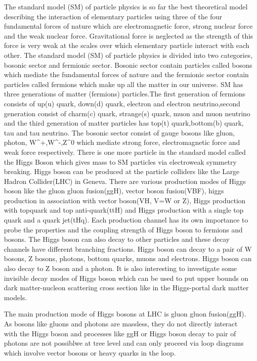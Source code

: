 \documentclass[final,3p]{CSP}
\begin{document}
The standard model (SM) of particle physics is so far the best theoretical model describing the interaction of elementary 
particles using three of the four fundamental forces of nature which are electromagnetic force, strong nuclear force and the weak
nuclear force. Gravitational force is neglected as the strength of this force is very weak at the scales over which elementary 
particle interact with each other. The standard model (SM) of particle physics is divided into two categories, bosonic sector 
and fermionic sector. Bosonic sector contain particles called bosons which mediate the fundamental forces of nature and the
fermionic sector contain particles called fermions which make up all the matter in our universe. SM has three generations of 
matter (fermions) particles.The first generation of fermions consists of up(u) quark, down(d) quark, electron and electron neutrino,second generation consist of charm(c) quark, strange(s) quark, muon and muon neutrino and the third generation of matter 
particles has top(t) quark,bottom(b) quark, tau and tau neutrino. The bosonic sector consist of gauge bosons like gluon, photon, 
W^+,W^-,Z^0 which mediate strong force, electromagnetic force and weak force respectively. There is one more particle in the 
standard model called the Higgs Boson which gives mass to SM particles via electroweak symmetry breaking. Higgs boson can be 
produced at the particle colliders like the Large Hadron Collider(LHC) in Geneva. There are various production modes of Higgs 
boson like the gluon gluon  fusion(ggH), vector boson fusion(VBF), higgs production in association with vector boson(VH, V=W or 
Z), Higgs production with topquark and top anti-quark(ttH) and Higgs production with a single top quark and a quark jet(tHq). 
Each production channel has its own importance to probe the properties and the coupling strength of Higgs boson to fermions and 
bosons. The Higgs boson can also decay to other particles and these decay channels have different branching fractions. Higgs 
boson can decay to a pair of W bosons, Z bosons, photons, bottom quarks, muons and electrons. Higgs boson can also decay to Z boson and a 
photon. It is also interesting to investigate some invisible decay modes of Higgs boson which can be used to put upper bounds on 
dark matter-nucleon scattering cross section like in the Higgs-portal dark matter models.

The main production mode of Higgs bosons at LHC is gluon gluon fusion(ggH). As bosons like gluons and photons are massless, they 
do not directly interact with the Higgs boson and processes like ggH or Higgs boson decay to pair of photons are not possiblwe at 
tree level and can only proceed via loop diagrams which involve vector bosons or heavy quarks in the loop.
\end{document}

